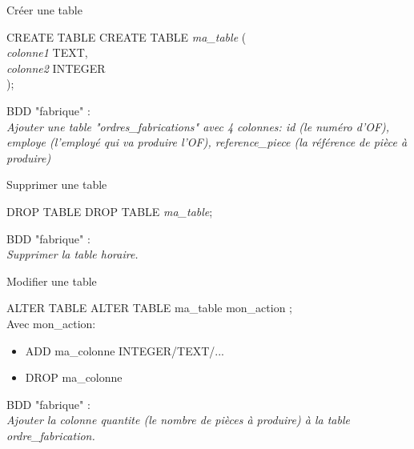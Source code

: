 \documentclass[xetex,dvipsnames]{beamer}
\begin{document}
\begin{frame}{Créer une table}

	\begin{alertblock}{CREATE TABLE}
	CREATE TABLE \textit{ma\_table} (\\
    \textit{colonne1}		TEXT,\\
	\textit{colonne2}		INTEGER\\
);
	\end{alertblock}
	\vspace{1em}
	BDD "fabrique" :\\
	\vspace{0.5em}
	\textit{Ajouter une table "ordres\_fabrications" avec 4 colonnes: id (le numéro d'OF), employe (l'employé qui va produire l'OF), reference\_piece (la référence de pièce à produire)}
\end{frame}

\begin{frame}{Supprimer une table}
	\begin{alertblock}{DROP TABLE}
	DROP TABLE \textit{ma\_table};
	\end{alertblock}
	
\begin{scriptsize}
	\vspace{1em}
	BDD "fabrique" :\\
	\vspace{0.5em}
	\textit{Supprimer la table horaire.}
\end{scriptsize}
\end{frame}


\begin{frame}{Modifier une table}

	\begin{alertblock}{ALTER TABLE}
	ALTER TABLE ma\_table mon\_action ;\\
	Avec mon\_action:
	\begin{itemize}
		\item ADD ma\_colonne INTEGER/TEXT/...
		\item DROP ma\_colonne
	\end{itemize}
	\end{alertblock}
	
\begin{scriptsize}
	\vspace{1em}
	BDD "fabrique" :\\
	\vspace{0.5em}
	\textit{Ajouter la colonne quantite (le nombre de pièces à produire) à la table ordre\_fabrication. }
\end{scriptsize}
\end{frame}
\end{document}
